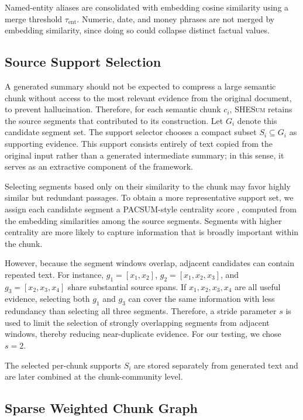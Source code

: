 \documentclass[11pt]{article}
\newcommand{\methodname}{\textsc{SHESum}}
\begin{document}
Named-entity aliases are consolidated with embedding cosine similarity using a merge threshold $\tau_{\mathrm{ent}}$. Numeric, date, and money phrases are not merged by embedding similarity, since doing so could collapse distinct factual values. 

\subsection{Source Support Selection}

A generated summary should not be expected to compress a large semantic chunk without access to the most relevant evidence from the original document, to prevent hallucination. Therefore, for each semantic chunk $c_i$, \methodname{} retains the source segments that contributed to its construction. Let $G_i$ denote this candidate segment set. The support selector chooses a compact subset $S_i \subseteq G_i$ as supporting evidence. This support consists entirely of text copied from the original input rather than a generated intermediate summary; in this sense, it serves as an extractive component of the framework.

Selecting segments based only on their similarity to the chunk may favor highly similar but redundant passages. To obtain a more representative support set, we assign each candidate segment a PACSUM-style centrality score \citep{zheng-lapata-2019-pacsum}, computed from the embedding similarities among the source segments. Segments with higher centrality are more likely to capture information that is broadly important within the chunk.

However, because the segment windows overlap, adjacent candidates can contain repeated text. For instance, $g_1=[x_1,x_2]$, $g_2=[x_1,x_2,x_3]$, and $g_3=[x_2,x_3,x_4]$ share substantial source spans. If $x_1,x_2,x_3,x_4$ are all useful evidence, selecting both $g_1$ and $g_3$ can cover the same information with less redundancy than selecting all three segments. Therefore, a stride parameter $s$ is used to limit the selection of strongly overlapping segments from adjacent windows, thereby reducing near-duplicate evidence. For our testing, we chose $s=2$. 

The selected per-chunk supports $S_i$ are stored separately from generated text and are later combined at the chunk-community level.

\subsection{Sparse Weighted Chunk Graph}
\end{document}
